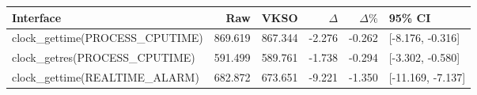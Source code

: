 \begin{tabular}{lrrrrl}
\toprule
Interface & Raw & VKSO & $\Delta$ & $\Delta\%$ & 95\% CI \\
\midrule
clock\_gettime(PROCESS\_CPUTIME) & 869.619 & 867.344 & -2.276 & -0.262 & [-8.176, -0.316] \\
clock\_getres(PROCESS\_CPUTIME) & 591.499 & 589.761 & -1.738 & -0.294 & [-3.302, -0.580] \\
clock\_gettime(REALTIME\_ALARM) & 682.872 & 673.651 & -9.221 & -1.350 & [-11.169, -7.137] \\
\bottomrule
\end{tabular}
